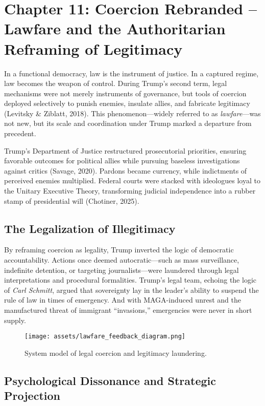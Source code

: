 \documentclass[
]{article}
\author{}
\date{}
\begin{document}
\chapter{Chapter 11: Coercion Rebranded -- Lawfare and the Authoritarian Reframing of Legitimacy}

In a functional democracy, law is the instrument of justice. In a captured regime, law becomes the weapon of control. During Trump's second term, legal mechanisms were not merely instruments of governance, but tools of coercion deployed selectively to punish enemies, insulate allies, and fabricate legitimacy (Levitsky \& Ziblatt, 2018). This phenomenon---widely referred to as \textit{lawfare}---was not new, but its scale and coordination under Trump marked a departure from precedent.

Trump's Department of Justice restructured prosecutorial priorities, ensuring favorable outcomes for political allies while pursuing baseless investigations against critics (Savage, 2020). Pardons became currency, while indictments of perceived enemies multiplied. Federal courts were stacked with ideologues loyal to the Unitary Executive Theory, transforming judicial independence into a rubber stamp of presidential will (Chotiner, 2025).

\section*{The Legalization of Illegitimacy}

By reframing coercion as legality, Trump inverted the logic of democratic accountability. Actions once deemed autocratic---such as mass surveillance, indefinite detention, or targeting journalists---were laundered through legal interpretations and procedural formalities. Trump's legal team, echoing the logic of \textit{Carl Schmitt}, argued that sovereignty lay in the leader's ability to suspend the rule of law in times of emergency. And with MAGA-induced unrest and the manufactured threat of immigrant ``invasions,'' emergencies were never in short supply.

\begin{figure}[H]
    \centering
    \texttt{[image: assets/lawfare\_feedback\_diagram.png]}
    \caption{System model of legal coercion and legitimacy laundering.}
    \label{fig:lawfare_model}
\end{figure}

\section*{Psychological Dissonance and Strategic Projection}
\end{document}
